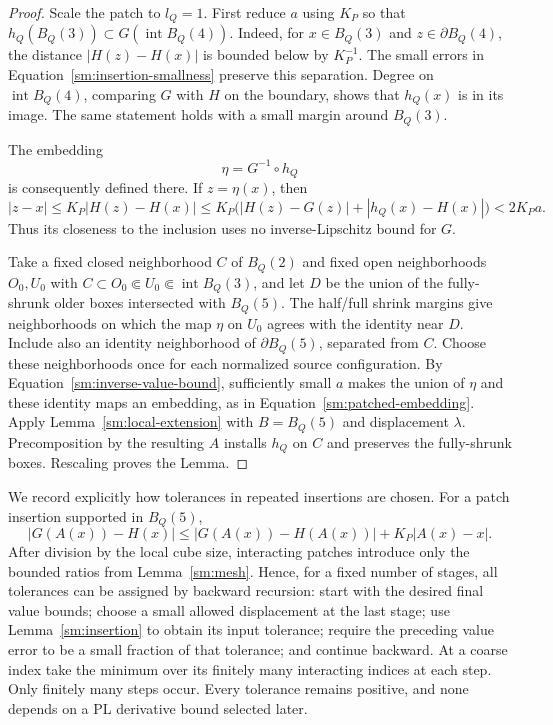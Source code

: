 \documentclass[11pt]{article}
\numberwithin{equation}{section}
\theoremstyle{definition}
\theoremstyle{remark}
\begin{document}
\begin{proof}
Scale the patch to $l_Q=1$.  First reduce $a$ using $K_P$ so
that $h_Q(B_Q(3))\subset G(\operatorname{int}B_Q(4))$.
Indeed, for $x\in B_Q(3)$ and $z\in\partial B_Q(4)$,
the distance $|H(z)-H(x)|$ is bounded below by $K_P^{-1}$.
The small errors in Equation~\eqref{sm:insertion-smallness} preserve
this separation.  Degree on $\operatorname{int}B_Q(4)$,
comparing $G$ with $H$ on the boundary, shows that $h_Q(x)$
is in its image.  The same statement holds with a small
margin around $B_Q(3)$.

The embedding
\[
 \eta=G^{-1}\circ h_Q
\]
is consequently defined there.  If $z=\eta(x)$, then
\begin{equation}
 \label{sm:inverse-value-bound}
 |z-x|\le K_P|H(z)-H(x)|
 \le K_P\bigl(|H(z)-G(z)|+|h_Q(x)-H(x)|\bigr)
 <2K_Pa.
\end{equation}
Thus its closeness to the inclusion uses no inverse-Lipschitz
bound for $G$.

Take a fixed closed neighborhood $C$ of $B_Q(2)$ and fixed
open neighborhoods $O_0,U_0$ with
$C\subset O_0\Subset U_0\Subset\operatorname{int}B_Q(3)$,
and let $D$ be the union of the fully-shrunk older
boxes intersected with $B_Q(5)$.  The half/full shrink margins
give neighborhoods on which the map $\eta$ on $U_0$ agrees
with the identity near $D$.  Include also an identity
neighborhood of $\partial B_Q(5)$, separated from $C$.
Choose these neighborhoods once for each normalized source
configuration.  By Equation~\eqref{sm:inverse-value-bound}, sufficiently
small $a$ makes the union of $\eta$ and these identity maps
an embedding, as in Equation~\eqref{sm:patched-embedding}.  Apply
Lemma~\ref{sm:local-extension} with $B=B_Q(5)$ and displacement
$\lambda$.  Precomposition by the resulting $A$ installs
$h_Q$ on $C$ and preserves the fully-shrunk boxes.  Rescaling
proves the Lemma.
\end{proof}

We record explicitly how tolerances in repeated insertions are chosen.
For a patch insertion supported in $B_Q(5)$,
\begin{equation}
 \label{sm:value-update}
 |G(A(x))-H(x)|
 \le |G(A(x))-H(A(x))|+K_P|A(x)-x|.
\end{equation}
After division by the local cube size, interacting patches introduce
only the bounded ratios from Lemma~\ref{sm:mesh}.  Hence, for a fixed
number of stages, all tolerances can be assigned by backward
recursion: start with the desired final value bounds; choose a small
allowed displacement at the last stage; use
Lemma~\ref{sm:insertion} to obtain its input tolerance; require the
preceding value error to be a small fraction of that tolerance; and
continue backward.  At a coarse index take the minimum over its
finitely many interacting indices at each step.  Only finitely many
steps occur.  Every tolerance remains positive, and none depends on a
PL derivative bound selected later.
\end{document}
